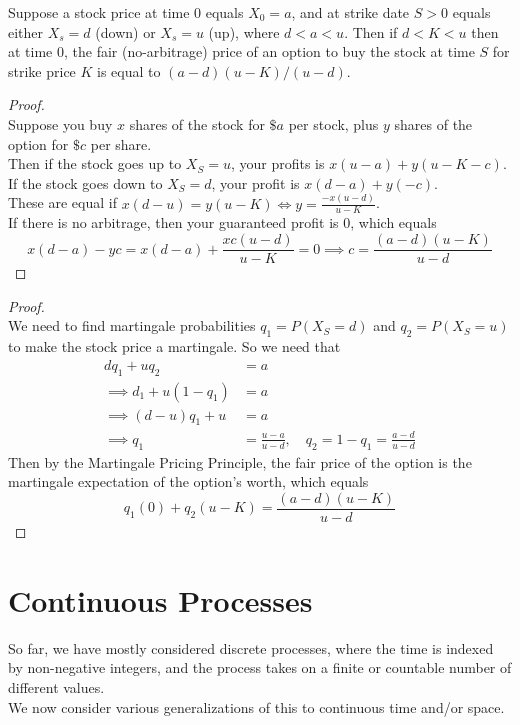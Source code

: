 \documentclass[11pt]{article}
\begin{document}
    \proposition Suppose a stock price at time 0 equals $X_0 = a$, and at strike date $S > 0$ equals either $X_s = d$ (down) or $X_s = u$ (up), where $d < a < u$. Then if $d < K < u$ then at time 0, the fair (no-arbitrage) price of an option to buy the stock at time $S$ for strike price $K$ is equal to $(a-d)(u-K)/(u-d)$.
    \begin{proof}\\
    	Suppose you buy $x$ shares of the stock for $\$a$ per stock, plus $y$ shares of the option for $\$c$ per share. \\
    	Then if the stock goes up to $X_S = u$, your profits is $x(u-a) + y(u-K-c)$.
    	If the stock goes down to $X_S = d$, your profit is $x(d-a) + y(-c)$.\\
    	These are equal if $x(d-u) = y(u-K) \iff y = \frac{-x(u-d)}{u-K}$. \\
    	If there is no arbitrage, then your guaranteed profit is 0, which equals
    	$$x(d-a) - yc = x(d-a) + \frac{xc(u-d)}{u-K} = 0 \implies c = \frac{(a-d)(u-K)}{u-d}$$
    \end{proof}
    \begin{proof}\\
    We need to find martingale probabilities $q_1 = P(X_S = d)$ and $q_2 = P(X_S = u)$ to make the stock price a martingale. So we need that
    \begin{align*}
    	dq_1 + uq_2 &= a \\
    	\implies d_1 + u(1-q_1) &= a \\
    	\implies (d-u)q_1 + u &= a\\
    	\implies q_1 &= \frac{u-a}{u-d}, \quad q_2 = 1 - q_1 = \frac{a-d}{u-d}
    \end{align*}
    Then by the Martingale Pricing Principle, the fair price of the option is the martingale expectation of the option's worth, which equals
    $$q_1(0) + q_2(u-K) = \frac{(a-d)(u-K)}{u-d}$$
    \end{proof}
    
    \section{Continuous Processes}
    So far, we have mostly considered discrete processes, where the time is indexed by non-negative integers, and the process takes on a finite or countable number of different values.\\
    We now consider various generalizations of this to continuous time and/or space. 
\end{document}
